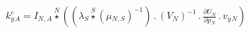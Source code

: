 \documentclass[border=2pt]{standalone}
\begin{document}
${{k^c_y}}{_{A}}={{I}}{_{N, A}} \stackrel{N}{\star} \left(\left({{\lambda}}{_{S}} \stackrel{S}{\star} \left( {{\mu}}{_{N, S}} \right)^{-1}\right) \, . \, \left( {V}{_{N}} \right)^{-1} \, . \, \frac{\partial{{U}{_{N}}}}{\partial{{p}{_{N}}}} \, . \, {{v_y}}{_{N}}\right)$
\end{document}

